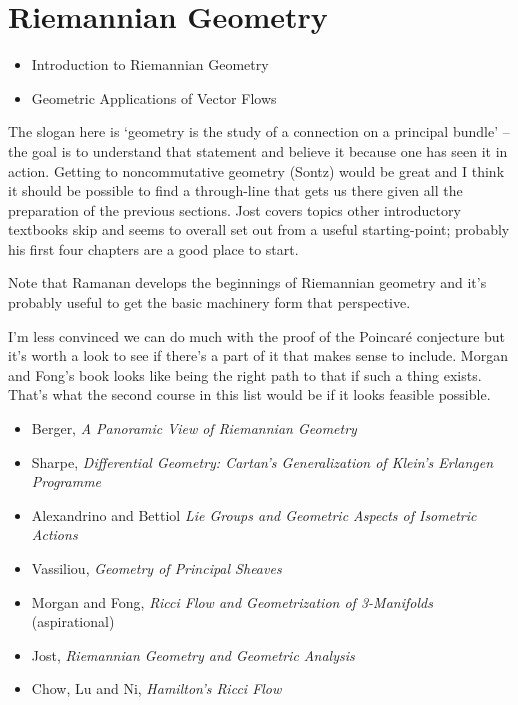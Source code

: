 \documentclass[article]{article}
\begin{document}
\section{Riemannian Geometry}

\begin{itemize}
	\item{Introduction to Riemannian Geometry}
	\item{Geometric Applications of Vector Flows}
\end{itemize}

The slogan here is `geometry is the study of a connection on a principal bundle' -- the goal is to understand that statement and believe it because one has seen it in action. Getting to noncommutative geometry (Sontz) would be great and I think it should be possible to find a through-line that gets us there given all the preparation of the previous sections.  Jost covers topics other introductory textbooks skip and seems to overall set out from a useful starting-point; probably his first four chapters are a good place to start.

Note that Ramanan develops the beginnings of Riemannian geometry and it's probably useful to get the basic machinery form that perspective.

I'm less convinced we can do much with the proof of the Poincar\'e conjecture but it's worth a look to see if there's a part of it that makes sense to include. Morgan and Fong's book looks like being the right path to that if such a thing exists. That's what the second course in this list would be if it looks feasible possible.

\begin{itemize}
	\item[]{Berger, \textit{A Panoramic View of Riemannian Geometry}}
	\item[]{Sharpe, \textit{Differential Geometry: Cartan's Generalization of Klein's Erlangen Programme}}
	\item{Alexandrino and Bettiol \textit{Lie Groups and Geometric Aspects of Isometric Actions}}
	\item[]{Vassiliou, \textit{Geometry of Principal Sheaves}}
	\item[]{Morgan and Fong, \textit{Ricci Flow and Geometrization of 3-Manifolds} (aspirational)}
	\item[]{Jost, \textit{Riemannian Geometry and Geometric Analysis}}
	\item[]{Chow, Lu and Ni, \textit{Hamilton's Ricci Flow}}
\end{itemize}
\end{document}
